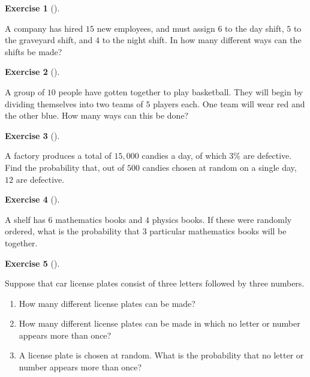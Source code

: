 \documentclass[
  letterpaper,
  DIV=11,
  numbers=noendperiod]{scrreprt}
\providecommand{\tightlist}{%
  \setlength{\itemsep}{0pt}\setlength{\parskip}{0pt}}\usepackage{longtable,booktabs,array}
\theoremstyle{definition}
\newtheorem{exercise}{Exercise}[chapter]
\theoremstyle{definition}
\theoremstyle{definition}
\theoremstyle{remark}
\begin{document}
\begin{exercise}[]\protect\hypertarget{exr-3.15}{}\label{exr-3.15}

A company has hired \(15\) new employees, and must assign \(6\) to the
day shift, \(5\) to the graveyard shift, and \(4\) to the night shift.
In how many different ways can the shifts be made?

\end{exercise}

\begin{exercise}[]\protect\hypertarget{exr-3.16}{}\label{exr-3.16}

A group of \(10\) people have gotten together to play basketball. They
will begin by dividing themselves into two teams of \(5\) players each.
One team will wear red and the other blue. How many ways can this be
done?

\end{exercise}

\begin{exercise}[]\protect\hypertarget{exr-3.17}{}\label{exr-3.17}

A factory produces a total of \(15,000\) candies a day, of which \(3\%\)
are defective. Find the probability that, out of \(500\) candies chosen
at random on a single day, \(12\) are defective.

\end{exercise}

\begin{exercise}[]\protect\hypertarget{exr-3.18}{}\label{exr-3.18}

A shelf has \(6\) mathematics books and \(4\) physics books. If these
were randomly ordered, what is the probability that \(3\) particular
mathematics books will be together.

\end{exercise}

\begin{exercise}[]\protect\hypertarget{exr-3.19}{}\label{exr-3.19}

Suppose that car license plates consist of three letters followed by
three numbers.

\begin{enumerate}
\def\labelenumi{\alph{enumi}.}
\tightlist
\item
  How many different license plates can be made?
\item
  How many different license plates can be made in which no letter or
  number appears more than once?
\item
  A license plate is chosen at random. What is the probability that no
  letter or number appears more than once?
\end{enumerate}

\end{exercise}
\end{document}
